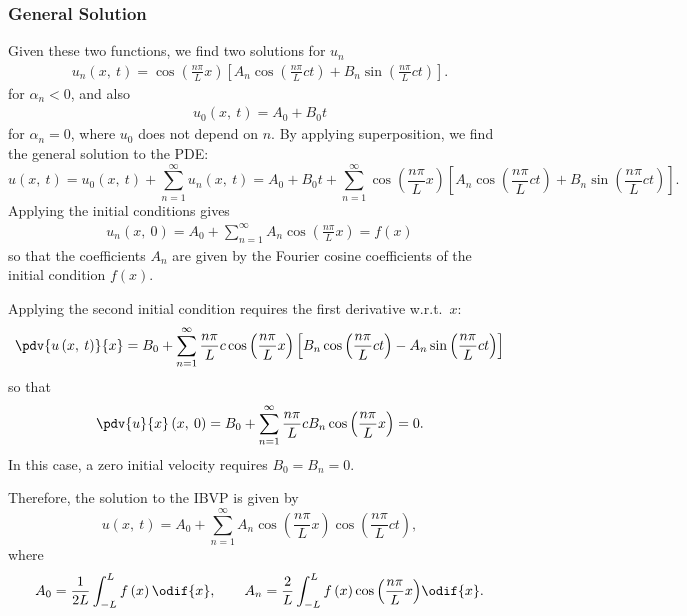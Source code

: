 \documentclass{article}
\begin{document}
\subsubsection{General Solution}
Given these two functions, we find two solutions for \(u_n\)
\begin{align*}
    u_n\left( x,\: t \right) = \cos{\left( \frac{n \pi}{L} x \right)} \left[ A_n \cos{\left( \frac{n \pi}{L} c t \right)} + B_n \sin{\left( \frac{n \pi}{L} c t \right)} \right].
\end{align*}
for \(\alpha_n < 0\), and also
\begin{align*}
    u_0\left( x,\: t \right) = A_0 + B_0 t
\end{align*}
for \(\alpha_n = 0\), where \(u_0\) does not depend on \(n\).
By applying superposition, we find the general solution to the PDE\@:
\begin{equation*}
    u\left( x,\: t \right) = u_0\left( x,\: t \right) + \sum_{n = 1}^\infty u_n\left( x,\: t \right) = A_0 + B_0 t + \sum_{n = 1}^\infty \cos{\left( \frac{n \pi}{L} x \right)} \left[ A_n \cos{\left( \frac{n \pi}{L} c t \right)} + B_n \sin{\left( \frac{n \pi}{L} c t \right)} \right].
\end{equation*}
Applying the initial conditions gives
\begin{align*}
    u_n\left( x,\: 0 \right) = A_0 + \sum_{n = 1}^\infty A_n \cos{\left( \frac{n \pi}{L} x \right)} = f\left( x \right)
\end{align*}
so that the coefficients \(A_n\) are given by the Fourier cosine coefficients of the initial condition \(f\left( x \right)\).

Applying the second initial condition requires the first derivative w.r.t.\ \(x\):
\begin{equation*}
    \pdv{u\left( x,\: t \right)}{x} = B_0 + \sum_{n = 1}^\infty \frac{n \pi}{L} c \cos{\left( \frac{n \pi}{L} x \right)} \left[ B_n \cos{\left( \frac{n \pi}{L} c t \right)} - A_n \sin{\left( \frac{n \pi}{L} c t \right)} \right]
\end{equation*}
so that
\begin{equation*}
    \pdv{u}{x}\left( x,\: 0 \right) = B_0 + \sum_{n = 1}^\infty \frac{n \pi}{L} c B_n \cos{\left( \frac{n \pi}{L} x \right)} = 0.
\end{equation*}
In this case, a zero initial velocity requires \(B_0 = B_n = 0\).

Therefore, the solution to the IBVP is given by
\begin{equation*}
    u\left( x,\: t \right) = A_0 + \sum_{n = 1}^\infty A_n \cos{\left( \frac{n \pi}{L} x \right)} \cos{\left( \frac{n \pi}{L} c t \right)},
\end{equation*}
where
\begin{equation*}
    A_0 = \frac{1}{2L} \int_{-L}^L f\left( x \right) \odif{x}, \quad\quad A_n = \frac{2}{L} \int_{-L}^{L} f\left( x \right) \cos{\left( \frac{n \pi}{L} x \right)} \odif{x}.
\end{equation*}
\end{document}
